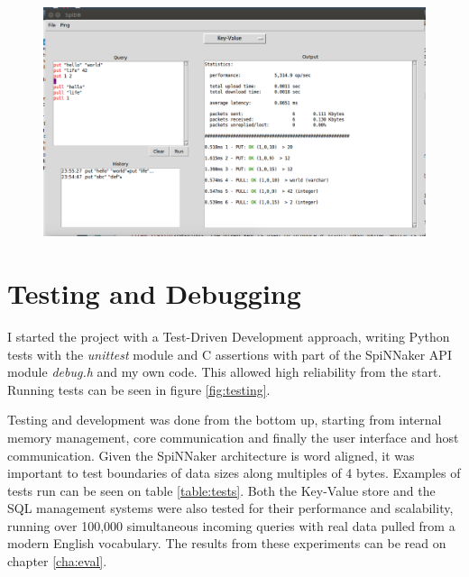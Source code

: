 \begin{figure}
\center
  \includegraphics[width=1\linewidth, natwidth=1036, natheight=622]{images/GUI.png}
  \label{fig:gui}
\end{figure}

\section{Testing and Debugging}
I started the project with a Test-Driven Development approach, writing Python tests with the \textit{unittest} module and C assertions with part of the SpiNNaker API module \textit{debug.h} and my own code. This allowed high reliability from the start. Running tests can be seen in figure \ref{fig:testing}.

Testing and development was done from the bottom up, starting from internal memory management, core communication and finally the user interface and host communication. Given the SpiNNaker architecture is word aligned, it was important to test boundaries of data sizes along multiples of 4 bytes. Examples of tests run can be seen on table \ref{table:tests}.
Both the Key-Value store and the SQL management systems were also tested for their performance and scalability, running over 100,000 simultaneous incoming queries with real data pulled from a modern English vocabulary. The results from these experiments can be read on chapter \ref{cha:eval}.

